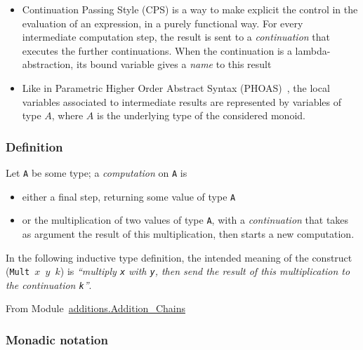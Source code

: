 \begin{itemize}
\item Continuation Passing Style (CPS) 
 \cite{reynolds93}
is a way to make explicit the 
     control in the evaluation of an expression, in a purely functional way. 
    For every intermediate computation step, the result is sent
    to a \emph{continuation} that executes the further continuations.
   When the continuation is a lambda-abstraction, its bound variable 
   gives a \emph{name} to this result


  
\item Like in Parametric Higher Order Abstract Syntax (PHOAS)~\cite{PHOAS}, 
     the local variables associated to intermediate results are
     represented by variables of  type $A$, where $A$ is the underlying type
  of the considered monoid.
\end{itemize}


\subsubsection{Definition}
\label{computation-def}
Let  \texttt{A} be some type;  a \emph{computation} on \texttt{A} is 
\begin{itemize}
\item  either a final step, returning some value of type \texttt{A}
\item or the multiplication of two values of type  \texttt{A}, with a  \emph{continuation}
  that takes as argument the result of this multiplication, then starts a new
  computation.
\end{itemize}
  
  In the following inductive type definition, the intended meaning 
  of the construct (\texttt{Mult $x$ $y$ $k$})  is \emph{``multiply \texttt{x} with
\texttt{y}, then send  the result of this multiplication to 
  the continuation  \texttt{k}''}.



From Module~\href{../theories/html/additions.Addition_Chains.html}{additions.Addition\_Chains}



\subsubsection{Monadic notation}

